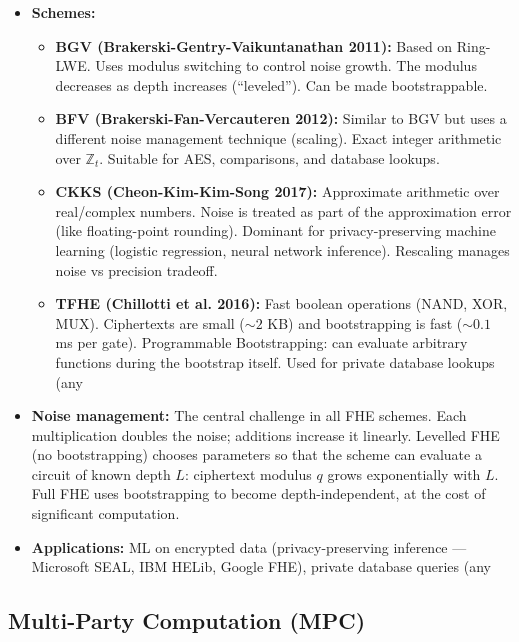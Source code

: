 \begin{itemize}
\item \textbf{Schemes:}
  \begin{itemize}
  \item \textbf{BGV (Brakerski-Gentry-Vaikuntanathan 2011):} Based on Ring-LWE. Uses modulus switching to control noise growth. The modulus decreases as depth increases (``leveled''). Can be made bootstrappable.
  \item \textbf{BFV (Brakerski-Fan-Vercauteren 2012):} Similar to BGV but uses a different noise management technique (scaling). Exact integer arithmetic over $\mathbb{Z}_t$. Suitable for AES, comparisons, and database lookups.
  \item \textbf{CKKS (Cheon-Kim-Kim-Song 2017):} Approximate arithmetic over real/complex numbers. Noise is treated as part of the approximation error (like floating-point rounding). Dominant for privacy-preserving machine learning (logistic regression, neural network inference). Rescaling manages noise vs precision tradeoff.
  \item \textbf{TFHE (Chillotti et al. 2016):} Fast boolean operations (NAND, XOR, MUX). Ciphertexts are small ($\sim 2$ KB) and bootstrapping is fast ($\sim 0.1$ ms per gate). Programmable Bootstrapping: can evaluate arbitrary functions during the bootstrap itself. Used for private database lookups (any%
  \end{itemize}
\item \textbf{Noise management:} The central challenge in all FHE schemes. Each multiplication doubles the noise; additions increase it linearly. Levelled FHE (no bootstrapping) chooses parameters so that the scheme can evaluate a circuit of known depth $L$: ciphertext modulus $q$ grows exponentially with $L$. Full FHE uses bootstrapping to become depth-independent, at the cost of significant computation.
\item \textbf{Applications:} ML on encrypted data (privacy-preserving inference — Microsoft SEAL, IBM HELib, Google FHE), private database queries (any%
\end{itemize}

\subsection{Multi-Party Computation (MPC)}
\label{sec:crypto:mpc}

